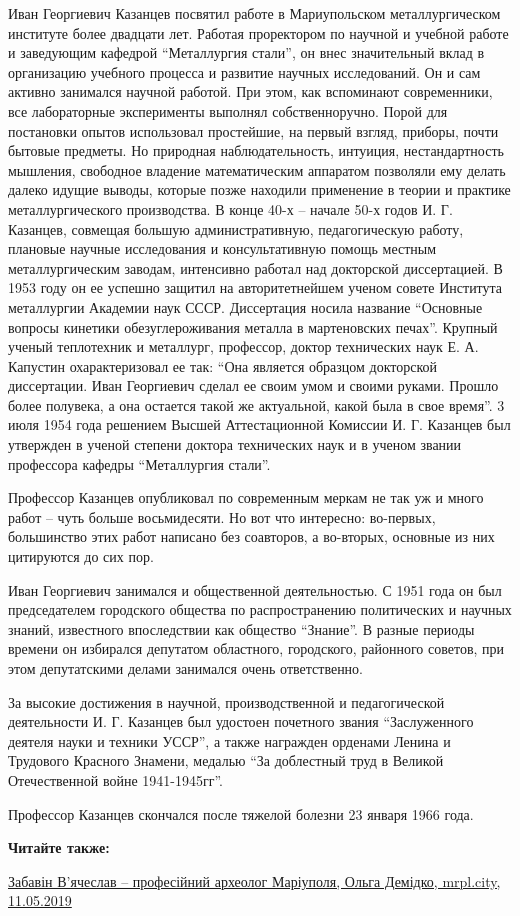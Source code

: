 Иван Георгиевич Казанцев посвятил работе в Мариупольском металлургическом
институте более двадцати лет. Работая проректором по научной и учебной работе и
заведующим кафедрой \enquote{Металлургия стали}, он внес значительный вклад в
организацию учебного процесса и развитие научных исследований. Он и сам активно
занимался научной работой. При этом, как вспоминают современники, все
лабораторные эксперименты выполнял собственноручно. Порой для постановки опытов
использовал простейшие, на первый взгляд, приборы, почти бытовые предметы. Но
природная наблюдательность, интуиция, нестандартность мышления, свободное
владение математическим аппаратом позволяли ему делать далеко идущие выводы,
которые позже находили применение в теории и практике металлургического
производства. В конце 40-х – начале 50-х годов И. Г. Казанцев, совмещая большую
административную, педагогическую работу, плановые научные исследования и
консультативную помощь местным металлургическим заводам, интенсивно работал над
докторской диссертацией. В 1953 году он ее успешно защитил на авторитетнейшем
ученом совете Института металлургии Академии наук СССР. Диссертация носила
название \enquote{Основные вопросы кинетики обезуглероживания металла в мартеновских
печах}. Крупный ученый теплотехник и металлург, профессор, доктор технических
наук Е. А. Капустин охарактеризовал ее так: \enquote{Она является образцом докторской
диссертации. Иван Георгиевич сделал ее своим умом и своими руками. Прошло более
полувека, а она остается такой же актуальной, какой была в свое время}. 3 июля
1954 года решением Высшей Аттестационной Комиссии И. Г. Казанцев был утвержден в
ученой степени доктора технических наук и в ученом звании профессора кафедры
\enquote{Металлургия стали}.

Профессор Казанцев опубликовал по современным меркам не так уж и много работ –
чуть больше восьмидесяти. Но вот что интересно: во-первых, большинство этих
работ написано без соавторов, а во-вторых, основные из них цитируются до сих
пор.

Иван Георгиевич занимался и общественной деятельностью. С 1951 года он был
председателем городского общества по распространению политических и научных
знаний, известного впоследствии как общество \enquote{Знание}. В разные периоды времени
он избирался депутатом областного, городского, районного советов, при этом
депутатскими делами занимался очень ответственно.

За высокие достижения в научной, производственной и педагогической деятельности
И. Г. Казанцев был удостоен почетного звания \enquote{Заслуженного деятеля науки и
техники УССР}, а также награжден орденами Ленина и Трудового Красного Знамени,
медалью \enquote{За доблестный труд в Великой Отечественной войне 1941-1945гг}.

Профессор Казанцев скончался после тяжелой болезни 23 января 1966 года.

\textbf{Читайте также:} 

\href{https://mrpl.city/blogs/view/zabavin-vyacheslavprofesijnij-arheolog-mariupolya}{%
Забавін В'ячеслав – професійний археолог Маріуполя, Ольга Демідко, mrpl.city, 11.05.2019}
